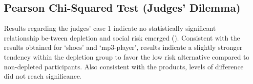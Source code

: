 \subsection{Pearson Chi-Squared Test (Judges’ Dilemma)}
Results regarding the judges’ case 1 indicate no statistically significant relationship be-tween depletion and social risk emerged (). Consistent with the results obtained for ‘shoes’ and ‘mp3-player’, results indicate a slightly stronger tendency within the depletion group to favor the low risk alternative compared to non-depleted participants. Also consistent with the products, levels of difference did not reach significance.

\begin{figure}
\begin{floatrow}
\capbfigbox{%

}
\end{floatrow}
\end{figure}
